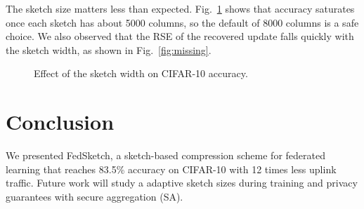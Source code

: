 \documentclass[conference]{IEEEtran}
\newcommand{\ours}{FedSketch}
\begin{document}
The sketch size matters less than expected. Fig.~\ref{fig:sketch} shows that accuracy saturates once each sketch has about 5000 columns, so the default of 8000 columns is a safe choice. We also observed that the RSE of the recovered update falls quickly with the sketch width, as shown in Fig.~\ref{fig:missing}.

\begin{figure}[t]
\centering
{}
\caption{Effect of the sketch width on CIFAR-10 accuracy.}
\label{fig:sketch}
\end{figure}

\section{Conclusion}
We presented \ours, a sketch-based compression scheme for federated learning that reaches 83.5\% accuracy on CIFAR-10 with 12 times less uplink traffic. Future work will study a adaptive sketch sizes during training and privacy guarantees with secure aggregation (SA).



\end{document}
